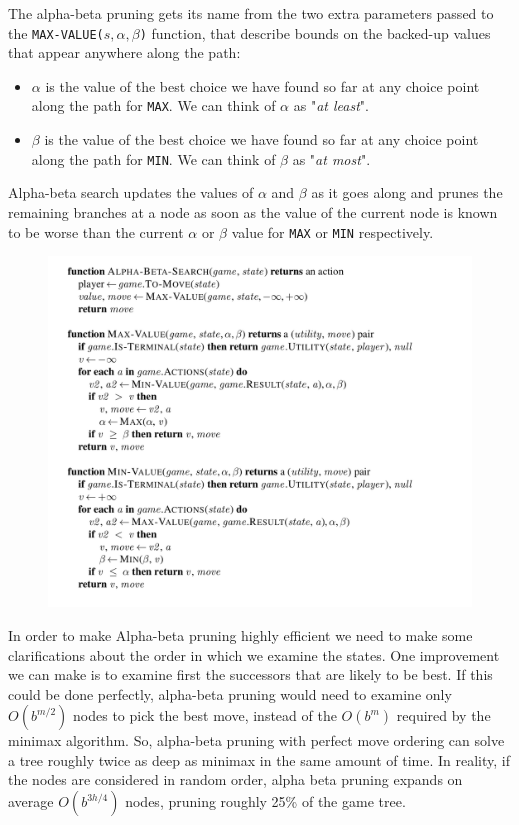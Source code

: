 \documentclass{article}
\newcommand{\code}{\lstinline}
\begin{document}
The alpha-beta pruning gets its name from the two extra parameters passed to the \code{MAX-VALUE(}$s, \alpha, \beta$\code{)} function, that describe bounds on the backed-up values that appear anywhere along the path:
\begin{itemize}
    \item $\alpha$ is the value of the best choice we have found so far at any choice point along the path for \code{MAX}. We can think of $\alpha$ as "\textit{at least}".
    \item $\beta$ is the value of the best choice we have found so far at any choice point along the path for \code{MIN}. We can think of $\beta$ as "\textit{at most}".
\end{itemize}

Alpha-beta search updates the values of $\alpha$ and $\beta$ as it goes along and prunes the remaining branches at a node as soon as the value of the current node is known to be worse than the current $\alpha$ or $\beta$ value for \code{MAX} or \code{MIN} respectively.

\begin{figure}[h]
    \centering
    \includegraphics[width=1\linewidth]{algorithms/Alpha Beta Pruning.png}
    \label{fig:alpha_beta_pruning_algorithm}
\end{figure}

In order to make Alpha-beta pruning highly efficient we need to make some clarifications about the order in which we examine the states. One improvement we can make is to examine first the successors that are likely to be best. If this could be done perfectly, alpha-beta pruning would need to examine only $O(b^{m/2})$ nodes to pick the best move, instead of the $O(b^m)$ required by the minimax algorithm. So, alpha-beta pruning with perfect move ordering can solve a tree roughly twice as deep as minimax in the same amount of time. In reality, if the nodes are considered in random order, alpha beta pruning expands on average $O(b^{3h/4})$ nodes, pruning roughly 25\% of the game tree.
\end{document}
